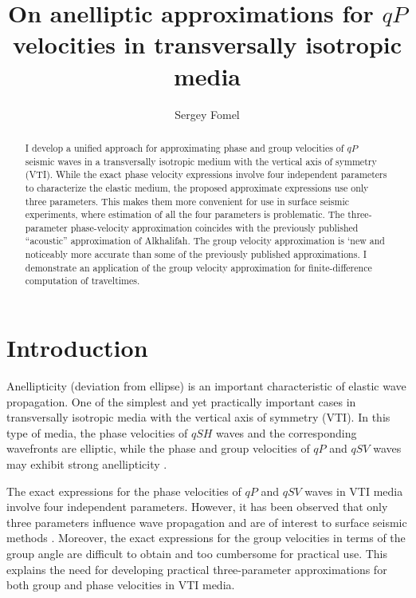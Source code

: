 \title{On anelliptic approximations for $qP$ velocities in
transversally isotropic media}

\author{Sergey Fomel}

\maketitle

\begin{abstract}
I develop a unified approach for approximating phase and group
  velocities of $qP$ seismic waves in a transversally isotropic medium
  with the vertical axis of symmetry (VTI). While the exact phase
  velocity expressions involve four independent parameters to
  characterize the elastic medium, the proposed approximate
  expressions use only three parameters. This makes them more
  convenient for use in surface seismic experiments, where estimation
  of all the four parameters is problematic. The three-parameter
  phase-velocity approximation coincides with the previously published
  ``acoustic'' approximation of Alkhalifah. The group velocity
  approximation is `new and noticeably more accurate than some of the
  previously published approximations. I demonstrate an application of
  the group velocity approximation for finite-difference computation
  of traveltimes.
\end{abstract}

\section{Introduction}

Anellipticity (deviation from ellipse) is an important characteristic of
elastic wave propagation. One of the simplest and yet practically important
cases  in transversally isotropic media with
the vertical axis of symmetry (VTI). In this type of media, the phase
velocities of $qSH$ waves and the corresponding wavefronts are elliptic, while
the phase and group velocities of $qP$ and $qSV$ waves may exhibit strong
anellipticity \cite[]{tsvankin}.

The exact expressions for the phase velocities of $qP$ and $qSV$ waves in VTI
media involve four independent parameters. However, it has been observed that
only three parameters influence wave propagation 
and are of interest to surface seismic methods
\cite[]{GEO60-05-15501566}. Moreover, the exact expressions for the group
velocities in terms of the group angle are difficult to obtain and too
cumbersome for practical use. This explains the need for developing practical
three-parameter approximations for both group and phase velocities in VTI
media.

